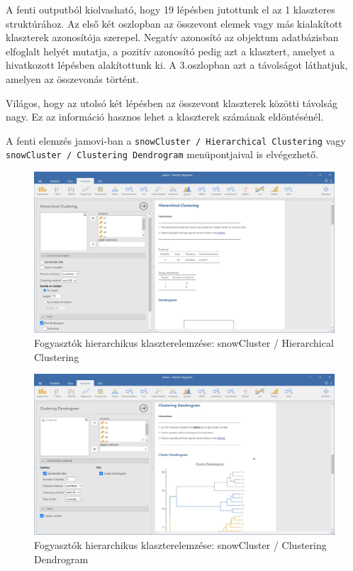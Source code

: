 \documentclass[
  letterpaper,
]{krantz}
\begin{document}
A fenti outputból kiolvasható, hogy 19 lépésben jutottunk el az 1
klaszteres struktúrához. Az első két oszlopban az összevont elemek vagy
más kialakított klaszterek azonosítója szerepel. Negatív azonosító az
objektum adatbázisban elfoglalt helyét mutatja, a pozitív azonosító
pedig azt a klasztert, amelyet a hivatkozott lépésben alakítottunk ki. A
3.oszlopban azt a távolságot láthatjuk, amelyen az összevonás történt.

Világos, hogy az utolsó két lépésben az összevont klaszterek közötti
távolság nagy. Ez az információ hasznos lehet a klaszterek számának
eldöntésénél.

A fenti elemzés jamovi-ban a
\texttt{snowCluster\ /\ Hierarchical\ Clustering} vagy
\texttt{snowCluster\ /\ Clustering\ Dendrogram} menüpontjaival is
elvégezhető.

\begin{figure}

{\centering \includegraphics{./images/klaszter_fogyaszto_01.jpg}

}

\caption{Fogyasztók hierarchikus klaszterelemzése: snowCluster /
Hierarchical Clustering}

\end{figure}

\begin{figure}

{\centering \includegraphics{./images/klaszter_fogyaszto_02.jpg}

}

\caption{Fogyasztók hierarchikus klaszterelemzése: snowCluster /
Clustering Dendrogram}

\end{figure}
\end{document}
